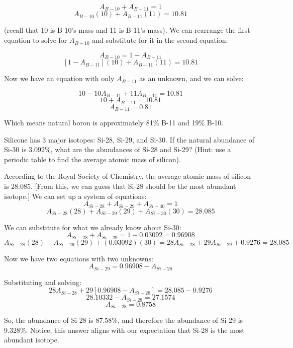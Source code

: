 $$A_{B-10} + A_{B-11} = 1$$
$$A_{B-10} \left( 10 \right) + A_{B-11} \left( 11 \right) = 10.81$$

(recall that 10 is B-10's mass and 11 is B-11's mass). We can rearrange the 
first equation to solve for $A_{B-10}$ and substitute for it in the second 
equation:

$$A_{B-10} = 1 - A_{B-11}$$
$$\left[ 1 - A_{B-11} \right] \left( 10 \right) + A_{B-11} \left( 11 \right) = 10.81$$

Now we have an equation with only $A_{B-11}$ as an unknown, and we can solve:

$$10 - 10A_{B-11} + 11A_{B-11} = 10.81$$
$$10 + A_{B-11} = 10.81$$
$$A_{B-11} = 0.81$$

Which means natural boron is approximately 81\% B-11 and 19\% B-10. 

\begin{Exercise}[title = {Finding Abundances}, label = abund]
Silicone has 3 major isotopes: Si-28, Si-29, and Si-30. If the natural 
abundance of Si-30 is 3.092\%, what are the abundances of Si-28 and Si-29? 
(Hint: use a periodic table to find the average atomic mass of silicon).
\end{Exercise}

\begin{Answer}[ref = abund]
According to the Royal Society of Chemistry, the average atomic mass of silicon 
is 28.085. [From this, we can guess that Si-28 should be the most abundant 
isotope.] We can set up a system of equations:
$$A_{Si-28} + A_{Si-29} + A_{Si-30} = 1$$
$$A_{Si-28} \left( 28 \right) + A_{Si-29} \left( 29 \right) + A_{Si-30} \left( 30 \right) = 28.085$$

We can substitute for what we already know about Si-30:
$$A_{Si-28} + A_{Si-29} = 1 - 0.03092 = 0.96908$$
$$A_{Si-28} \left( 28 \right) + A_{Si-29} \left( 29 \right) + \left( 0.03092 \right) \left(30 \right) = 28A_{Si-28} + 29A_{Si-29} + 0.9276 = 28.085$$

Now we have two equations with two unknowns:
$$A_{Si-29} = 0.96908 - A_{Si-28}$$

Substituting and solving:
$$28A_{Si-28} + 29 \left[ 0.96908 - A_{Si-28} \right] = 28.085 - 0.9276$$
$$28.10332 - A_{Si-28} = 27.1574$$
$$A_{Si-28} = 0.8758$$

So, the abundance of Si-28 is 87.58\%, and therefore the abundance of Si-29 is 
9.328\%. Notice, this answer aligns with our expectation that Si-28 is the most 
abundant isotope. 
\end{Answer}

